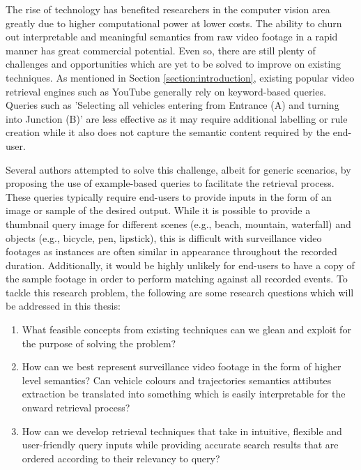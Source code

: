 
The rise of technology has benefited researchers in the computer vision area
greatly due to higher computational power at lower costs. The ability to churn
out interpretable and meaningful semantics from raw video footage in a rapid manner has great commercial potential. Even so, there are still plenty of challenges and opportunities which are yet to be solved to improve on existing techniques. As mentioned in Section \ref{section:introduction}, existing popular video retrieval engines such as YouTube generally rely on keyword-based queries. Queries such as 'Selecting all vehicles entering from Entrance (A) and turning into Junction (B)' are less effective as it may require additional labelling or rule creation while it also does not capture the semantic content required by the end-user.

Several authors attempted to solve this challenge,
albeit for generic scenarios,
by proposing the use of example-based queries \cite{zhang2017car, liu2016large, castanon2016retrieval} to facilitate the retrieval process.
These queries typically require end-users to provide inputs in the form of an image or sample of the desired output. While it is possible to provide a thumbnail query image for different scenes (e.g., beach, mountain, waterfall) and objects (e.g., bicycle, pen, lipstick), this is difficult with surveillance video footages as instances are often similar in appearance throughout the recorded duration. Additionally, it would be highly unlikely for end-users to have a copy of the sample footage in order to perform matching against all recorded events.
To tackle this research problem, the following are some research questions which will be addressed in this thesis:
\begin{enumerate}
\item What feasible concepts from existing techniques can we glean and exploit for the purpose of solving the problem?
\item How can we best represent surveillance video footage in the form of higher
  level semantics? Can vehicle colours and trajectories semantics attibutes
    extraction be translated into something which is easily interpretable for the onward retrieval process?
\item How can we develop retrieval techniques that take in intuitive, flexible and user-friendly query inputs while providing accurate search results that are ordered according to their relevancy to query?
\end{enumerate}


